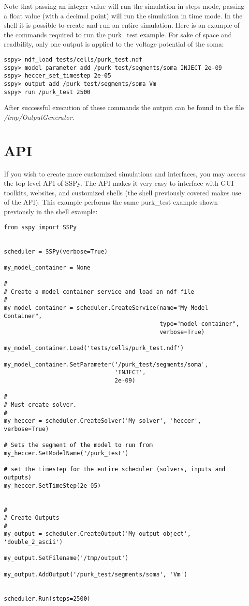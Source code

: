 \documentclass[12pt]{article}
\begin{document}
Note that passing an integer value will run the simulation in steps mode, passing a float value (with a decimal point) will run the simulation in time mode. In the shell it is possible to create and run an entire simulation. Here is an example of the commands required to run the purk\_test example. For sake of space and readbility, only one output is applied to the voltage potential of the soma:

\begin{verbatim}
sspy> ndf_load tests/cells/purk_test.ndf
sspy> model_parameter_add /purk_test/segments/soma INJECT 2e-09
sspy> heccer_set_timestep 2e-05
sspy> output_add /purk_test/segments/soma Vm
sspy> run /purk_test 2500
\end{verbatim}

After successful execution of these commands the output can be found
in the file {\it /tmp/OutputGenerator}.

\section*{API}

	If you wish to create more customized simulations and interfaces, you may access the top level API of SSPy. The API makes it very easy to interface with GUI toolkits, websites, and customized shells (the shell previously covered makes use of the API). This example performs the same purk\_test example shown previously in the shell example:
	
\begin{verbatim}
from sspy import SSPy 


scheduler = SSPy(verbose=True)

my_model_container = None

#
# Create a model container service and load an ndf file
#    
my_model_container = scheduler.CreateService(name="My Model Container",
                                             type="model_container",
                                             verbose=True)

my_model_container.Load('tests/cells/purk_test.ndf')

my_model_container.SetParameter('/purk_test/segments/soma',
                                'INJECT',
                                2e-09)

#
# Must create solver.
#
my_heccer = scheduler.CreateSolver('My solver', 'heccer', verbose=True)

# Sets the segment of the model to run from
my_heccer.SetModelName('/purk_test')

# set the timestep for the entire scheduler (solvers, inputs and outputs)
my_heccer.SetTimeStep(2e-05)


#
# Create Outputs
#
my_output = scheduler.CreateOutput('My output object', 'double_2_ascii')

my_output.SetFilename('/tmp/output')

my_output.AddOutput('/purk_test/segments/soma', 'Vm')


scheduler.Run(steps=2500)

\end{verbatim}
\end{document}
